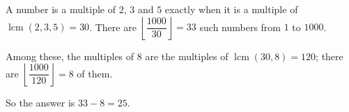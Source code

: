 A number is a multiple of $2$, $3$ and $5$ exactly when it is a multiple of $\operatorname{lcm}(2,3,5)=30$. There are $\left\lfloor\dfrac{1000}{30}\right\rfloor=33$ such numbers from $1$ to $1000$.

Among these, the multiples of $8$ are the multiples of $\operatorname{lcm}(30,8)=120$; there are $\left\lfloor\dfrac{1000}{120}\right\rfloor=8$ of them.

So the answer is $33-8=\boxed{25}$.
